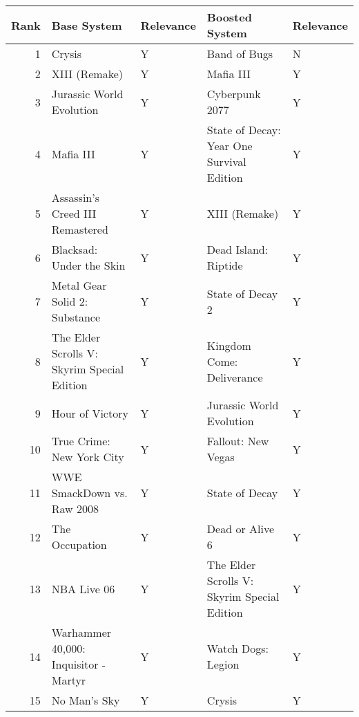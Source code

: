 \begin{tabular}{rllll}
\toprule
 Rank &                                 Base System & Relevance &                              Boosted System & Relevance \\
\midrule
    1 &                                      Crysis &         Y &                                Band of Bugs &         N \\
    2 &                               XIII (Remake) &         Y &                                   Mafia III &         Y \\
    3 &                    Jurassic World Evolution &         Y &                              Cyberpunk 2077 &         Y \\
    4 &                                   Mafia III &         Y &   State of Decay: Year One Survival Edition &         Y \\
    5 &             Assassin's Creed III Remastered &         Y &                               XIII (Remake) &         Y \\
    6 &                    Blacksad: Under the Skin &         Y &                        Dead Island: Riptide &         Y \\
    7 &               Metal Gear Solid 2: Substance &         Y &                            State of Decay 2 &         Y \\
    8 & The Elder Scrolls V: Skyrim Special Edition &         Y &                   Kingdom Come: Deliverance &         Y \\
    9 &                             Hour of Victory &         Y &                    Jurassic World Evolution &         Y \\
   10 &                   True Crime: New York City &         Y &                          Fallout: New Vegas &         Y \\
   11 &                  WWE SmackDown vs. Raw 2008 &         Y &                              State of Decay &         Y \\
   12 &                              The Occupation &         Y &                             Dead or Alive 6 &         Y \\
   13 &                                 NBA Live 06 &         Y & The Elder Scrolls V: Skyrim Special Edition &         Y \\
   14 &       Warhammer 40,000: Inquisitor - Martyr &         Y &                          Watch Dogs: Legion &         Y \\
   15 &                                No Man's Sky &         Y &                                      Crysis &         Y \\

\end{tabular}

